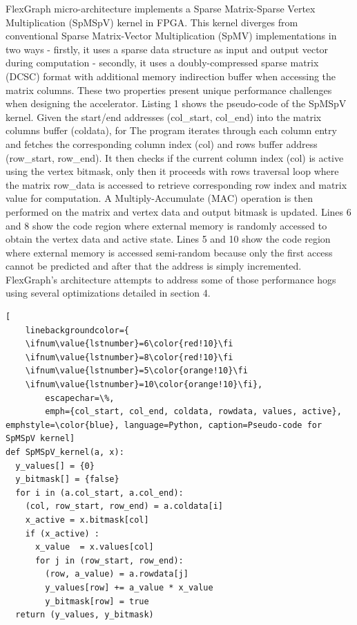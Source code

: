 FlexGraph micro-architecture implements a Sparse Matrix-Sparse Vertex Multiplication (SpMSpV) kernel in FPGA. This kernel diverges from conventional Sparse Matrix-Vector Multiplication (SpMV) implementations in two ways - firstly, it uses a sparse data structure as input and output vector during computation - secondly, it uses a doubly-compressed sparse matrix (DCSC) format with additional memory indirection buffer when accessing the matrix columns. These two properties present unique performance challenges when designing the accelerator. Listing 1 shows the pseudo-code of the SpMSpV kernel. Given the start/end addresses (col\_start, col\_end) into the matrix columns buffer (coldata), for The program iterates through each column entry and fetches the corresponding column index (col) and rows buffer address (row\_start, row\_end). It then checks if the current column index (col) is active using the vertex bitmask, only then it proceeds with rows traversal loop where the matrix row\_data is accessed to retrieve corresponding row index and matrix value for computation. A Multiply-Accumulate (MAC) operation is then performed on the matrix and vertex data and output bitmask is updated. Lines 6 and 8 show the code region where external memory is randomly accessed to obtain the vertex data and active state. Lines 5 and 10 show the code region where external memory is accessed semi-random because only the first access cannot be predicted and after that the address is simply incremented. FlexGraph's architecture attempts to address some of those performance hogs using several optimizations detailed in section 4.

\begin{lstlisting}[
	linebackgroundcolor={
	\ifnum\value{lstnumber}=6\color{red!10}\fi
	\ifnum\value{lstnumber}=8\color{red!10}\fi
	\ifnum\value{lstnumber}=5\color{orange!10}\fi
	\ifnum\value{lstnumber}=10\color{orange!10}\fi}, 
        escapechar=\%, 
        emph={col_start, col_end, coldata, rowdata, values, active}, emphstyle=\color{blue}, language=Python, caption=Pseudo-code for SpMSpV kernel]
def SpMSpV_kernel(a, x):
  y_values[] = {0}
  y_bitmask[] = {false}
  for i in (a.col_start, a.col_end):            	
    (col, row_start, row_end) = a.coldata[i]
    x_active = x.bitmask[col]          
    if (x_active) :                            
      x_value  = x.values[col]              
      for j in (row_start, row_end): 
        (row, a_value) = a.rowdata[j]
        y_values[row] += a_value * x_value
        y_bitmask[row] = true          
  return (y_values, y_bitmask)
\end{lstlisting}

